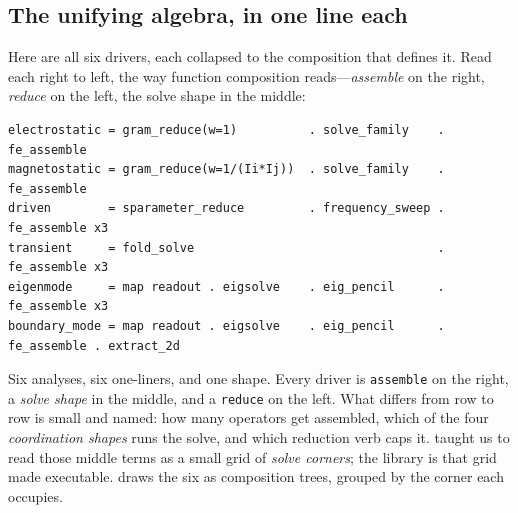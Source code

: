 \subsection{The unifying algebra, in one line each}

Here are all six drivers, each collapsed to the composition that defines it. Read
each right to left, the way function composition reads---\emph{assemble} on the
right, \emph{reduce} on the left, the solve shape in the middle:

\begin{lstlisting}[style=l4style]
electrostatic = gram_reduce(w=1)          . solve_family    . fe_assemble
magnetostatic = gram_reduce(w=1/(Ii*Ij))  . solve_family    . fe_assemble
driven        = sparameter_reduce         . frequency_sweep . fe_assemble x3
transient     = fold_solve                                  . fe_assemble x3
eigenmode     = map readout . eigsolve    . eig_pencil      . fe_assemble x3
boundary_mode = map readout . eigsolve    . eig_pencil      . fe_assemble . extract_2d
\end{lstlisting}

\noindent Six analyses, six one-liners, and one shape. Every driver is
\texttt{assemble} on the right, a \emph{solve shape} in the middle, and a
\texttt{reduce} on the left. What differs from row to row is small and named: how
many operators get assembled, which of the four \emph{coordination shapes} runs the
solve, and which reduction verb caps it.  taught us to read those
middle terms as a small grid of \emph{solve corners}; the  library is
that grid made executable.  draws the six as composition trees,
grouped by the corner each occupies.

